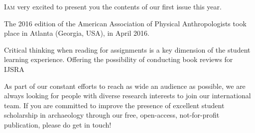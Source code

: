 \def\IJSRAidentifier{\currfilebase} %
\def\shorttitle{Issue Presentation}
\def\maintitle{Presentation of the First Issue of IJSRA in 2017}
\def\cmail{gonzalo.linaresmatas@st-hughs.ox.ac.uk}
\def\authorone{Gonzalo Linares Matás}
\def\bioone{\authorone is a third-year undergraduate student reading the BA Archaeology \& Anthropology at St~Hugh’s College, University of Oxford (UK). 
He was the former President of the Oxford University Archaeology Society (Michaelmas 2015), and he has recently been invited to join the WAC (World Archaeology Congress) Student Committee. 
He is particularly interested in the socio-political contexts of heritage management and ownership, contemporary archaeological theory, and the histories of the academic disciplines of archaeology and anthropology as practical modes of inquiry. 
He is doing his undergraduate dissertation on the socio-economic dimensions of early bone technology, focusing on the late Early Pleistocene assemblage at the site of Cueva Negra del Estrecho del Río Quípar (Murcia, Spain). 
He is also very interested in transforming the academic publishing landscape.}
\def\affilone{Executive Editor, International Journal of Student Research in Archaeology
\\St. Hugh’s College, University of Oxford}


\IJSRAopening%
\lettrine{I}{am} very excited to present you the contents of our first issue this year.

The 2016 edition of the American Association of Physical Anthropologists took place in Atlanta (Georgia, USA), in April 2016. 


Critical thinking when reading for assignments is a key dimension of the student learning experience. Offering the possibility of conducting book reviews for IJSRA 

\IJSRAseparator
{}

As part of our constant efforts to reach as wide an audience as possible, we are always looking for people with diverse research interests to join our international team. If you are committed to improve the presence of excellent student scholarship in archaeology through our free, open-access, not-for-profit publication, please do get in touch!

\IJSRAclosing%
